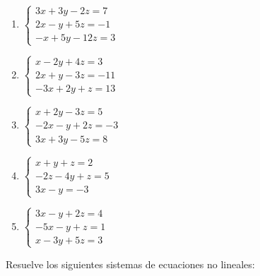 \begin{enumerate}[topsep=0pt]
	\item $ \begin{cases}
		3x+3y-2z = 7 \\
		2x-y+5z = -1 \\
		-x+5y-12z = 3
	\end{cases} $
	
	\item $ \begin{cases}
			x-2y + 4z = 3 \\
			2x+y-3z = -11 \\
			-3x+2y+z = 13
			\end{cases} $
	
	\item $ \begin{cases}
		x+2y-3z = 5 \\
		-2x-y+2z = -3 \\
		3x+3y-5z=8
	\end{cases} $

	
	\item $ \begin{cases}
		x+y+z= 2 \\
		-2z-4y+z = 5 \\
		3x-y = -3
	\end{cases} $
	
	\item $ \begin{cases}
		3x-y+2z=4\\
		-5x-y+z=1\\
		x-3y+5z=3
	\end{cases} $

\end{enumerate}

\Exercicio Resuelve los siguientes sistemas de ecuaciones no lineales:

